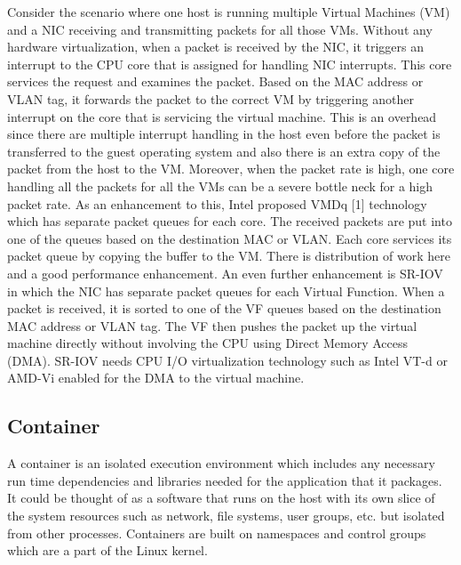 \documentclass[english, 12pt, a4paper, elec, utf8, a-1b, online]{aaltothesis}
\begin{document}
Consider the scenario where one host is running multiple Virtual Machines (VM) and a NIC receiving and transmitting packets for all those VMs. Without any hardware virtualization, when a packet is received by the NIC, it triggers an interrupt to the CPU core that is assigned for handling NIC interrupts. This core services the request and examines the packet. Based on the MAC address or VLAN tag, it forwards the packet to the correct VM by triggering another interrupt on the core that is servicing the virtual machine. This is an overhead since there are multiple interrupt handling in the host even before the packet is transferred to the guest operating system and also there is an extra copy of the packet from the host to the VM. Moreover, when the packet rate is high, one core handling all the packets for all the VMs can be a severe bottle neck for a high packet rate. As an enhancement to this, Intel proposed VMDq [1] technology which has separate packet queues for each core. The received packets are put into one of the queues based on the destination MAC or VLAN. Each core services its packet queue by copying the buffer to the VM. There is distribution of work here and a good performance enhancement. An even further enhancement is SR-IOV in which the NIC has separate packet queues for each Virtual Function. When a packet is received, it is sorted to one of the VF queues based on the destination MAC address or VLAN tag. The VF then pushes the packet up the virtual machine directly without involving the CPU using Direct Memory Access (DMA). SR-IOV needs CPU I/O virtualization technology such as Intel VT-d or AMD-Vi enabled for the DMA to the virtual machine.

\subsection{Container}
A container is an isolated execution environment which includes any necessary run time dependencies and libraries needed for the application that it packages. It could be thought of as a software that runs on the host with its own slice of the system resources such as network, file systems, user groups, etc. but isolated from other processes. Containers are built on namespaces and control groups which are a part of the Linux kernel.
\end{document}
